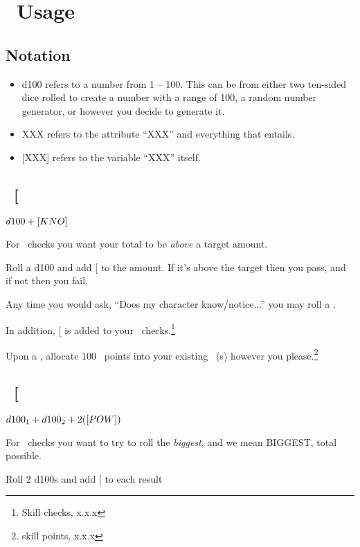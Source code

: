 \section{\attribute\ Usage}

\subsection*{Notation}
\begin{itemize}
\item d100 refers to a number from 1 -- 100. This can be from
either two ten-sided dice rolled to create a number with a range of
100, a random number generator, or however you decide to generate
it.
\item XXX refers to the attribute ``XXX'' and everything that entails.
\item {[}XXX{]} refers to the variable ``XXX'' itself.
\end{itemize}

\subsection{\KNOWful\  {[}\KNOW\index{Attribute!KNO}{]}}

\emph{$d100+[KNO]$}

\noindent For \KNOWful\  checks you want your total to be \textit{above}
a target amount.

\noindent Roll a d100 and add {[}\KNOW{]} to the amount. If it's
above the target then you pass, and if not then you fail.

\noindent Any time you would ask, ``Does my character know/notice...''
you may roll a \KNOW.

\noindent In addition, {[}\KNOW{]} is added to your \skills\  checks.\footnote{Skill checks, x.x.x}

\noindent Upon a \BURST, allocate 100 \skills\  points into your
existing \skills\ (s) however you please.\footnote{skill points, x.x.x}

\subsection{\POWEful\  {[}\POWE\index{Attribute!POW}{]}}

\emph{$d100_{1}+d100_{2}+2([POW])$}

\noindent For \POWEful\  checks you want to try to roll the \textit{biggest},
and we mean BIGGEST, total possible.

\noindent Roll 2 d100s and add {[}\POWE{]} to each result

